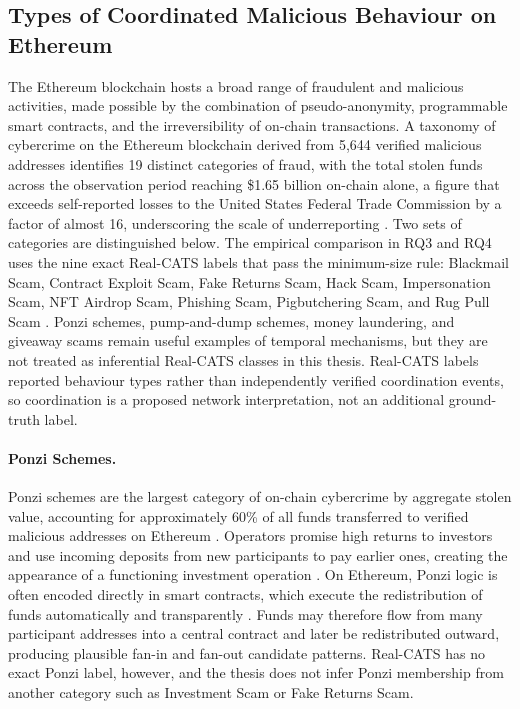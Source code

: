 \subsection{Types of Coordinated Malicious Behaviour on Ethereum}
\label{sec:scam_types}
The Ethereum blockchain hosts a broad range of fraudulent and malicious activities, made possible by the combination of pseudo-anonymity, programmable smart contracts, and the irreversibility of on-chain transactions. A taxonomy of cybercrime on the Ethereum blockchain derived from 5,644 verified malicious addresses identifies 19 distinct categories of fraud, with the total stolen funds across the observation period reaching \$1.65 billion on-chain alone, a figure that exceeds self-reported losses to the United States Federal Trade Commission by a factor of almost 16, underscoring the scale of underreporting \citep{hornuf2025cybercrime}. Two sets of categories are distinguished below. The empirical comparison in RQ3 and RQ4 uses the nine exact Real-CATS labels that pass the minimum-size rule: Blackmail Scam, Contract Exploit Scam, Fake Returns Scam, Hack Scam, Impersonation Scam, NFT Airdrop Scam, Phishing Scam, Pigbutchering Scam, and Rug Pull Scam \citep{shi2025realcats}. Ponzi schemes, pump-and-dump schemes, money laundering, and giveaway scams remain useful examples of temporal mechanisms, but they are not treated as inferential Real-CATS classes in this thesis. Real-CATS labels reported behaviour types rather than independently verified coordination events, so coordination is a proposed network interpretation, not an additional ground-truth label.

\paragraph{Ponzi Schemes.}
Ponzi schemes are the largest category of on-chain cybercrime by aggregate stolen value, accounting for approximately 60\% of all funds transferred to verified malicious addresses on Ethereum \citep{hornuf2025cybercrime}. Operators promise high returns to investors and use incoming deposits from new participants to pay earlier ones, creating the appearance of a functioning investment operation \citep{bartoletti2020smart}. On Ethereum, Ponzi logic is often encoded directly in smart contracts, which execute the redistribution of funds automatically and transparently \citep{chen2020survey}. Funds may therefore flow from many participant addresses into a central contract and later be redistributed outward, producing plausible fan-in and fan-out candidate patterns. Real-CATS has no exact Ponzi label, however, and the thesis does not infer Ponzi membership from another category such as Investment Scam or Fake Returns Scam.


